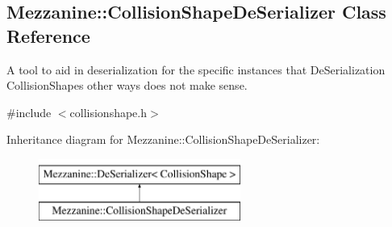 \hypertarget{classMezzanine_1_1CollisionShapeDeSerializer}{
\subsection{Mezzanine::CollisionShapeDeSerializer Class Reference}
\label{classMezzanine_1_1CollisionShapeDeSerializer}
}


A tool to aid in deserialization for the specific instances that DeSerialization CollisionShapes other ways does not make sense.  




{\ttfamily \#include $<$collisionshape.h$>$}

Inheritance diagram for Mezzanine::CollisionShapeDeSerializer:\begin{figure}[H]
\begin{center}
\leavevmode
\includegraphics[height=2.000000cm]{classMezzanine_1_1CollisionShapeDeSerializer}
\end{center}
\end{figure}
